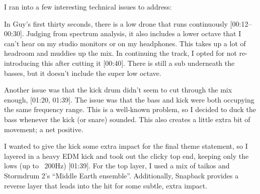 
%
%
%

%
%
%


I ran into a few interesting technical issues to address:

In Guy's first thirty seconds, there is a low drone that runs continuously [00:12--00:30]. Judging from spectrum analysis, it also includes a lower octave that I can't hear on my studio monitors or on my headphones. This takes up a lot of headroom and muddies up the mix. In continuing the track, I opted for not re-introducing this after cutting it [00:40]. There is still a sub underneath the basses, but it doesn't include the super low octave.

Another issue was that the kick drum didn't seem to cut through the mix enough, [01:20, 01:39]. The issue was that the bass and kick were both occupying the same frequency range. This is a well-known problem, so I decided to duck the bass whenever the kick (or snare) sounded. This also creates a little extra bit of movement; a net positive.

I wanted to give the kick some extra impact for the final theme statement, so I layered in a heavy EDM kick and took out the clicky top end, keeping only the lows (up to ~200Hz) [01:39]. For the top layer, I used a mix of taikos and Stormdrum 2's ``Middle Earth ensemble''. Additionally, Snapback provides a reverse layer that leads into the hit for some subtle, extra impact.
